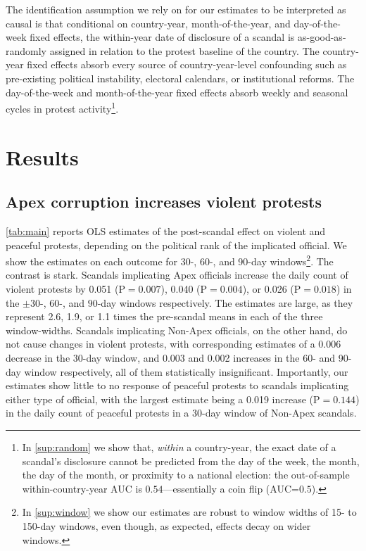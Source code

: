 \documentclass[11pt]{article}
\begin{document}
The identification assumption we rely on for our estimates to be interpreted as causal is that conditional on country-year, month-of-the-year, and day-of-the-week fixed effects, the within-year date of disclosure of a scandal is as-good-as-randomly assigned in relation to the protest baseline of the country. The country-year fixed effects absorb every source of country-year-level confounding such as pre-existing political instability, electoral calendars, or institutional reforms. The day-of-the-week and month-of-the-year fixed effects absorb weekly and seasonal cycles in protest activity\footnote{In \autoref{sup:random} we show that, \emph{within} a country-year, the exact date of a scandal's disclosure cannot be predicted from the day of the week, the month, the day of the month, or proximity to a national election: the out-of-sample within-country-year AUC is $0.54$---essentially a coin flip (AUC=$0.5$).}.

\section{Results}

\subsection{Apex corruption increases violent protests}

\autoref{tab:main} reports OLS estimates of the post-scandal effect on violent and peaceful protests, depending on the political rank of the implicated official. We show the estimates on each outcome for 30-, 60-, and 90-day windows\footnote{In \autoref{sup:window} we show our estimates are robust to window widths of 15- to 150-day windows, even though, as expected, effects decay on wider windows.}. The contrast is stark. Scandals implicating Apex officials increase the daily count of violent protests by 0.051 (P$=0.007$), 0.040 (P$=0.004$), or 0.026 (P$=0.018$) in the $\pm30$-, $60$-, and $90$-day windows respectively. The estimates are large, as they represent 2.6, 1.9, or 1.1 times the pre-scandal means in each of the three window-widths. Scandals implicating Non-Apex officials, on the other hand, do not cause changes in violent protests, with corresponding estimates of a 0.006 decrease in the 30-day window, and 0.003 and 0.002 increases in the 60- and 90-day window respectively, all of them statistically insignificant. Importantly, our estimates show little to no response of peaceful protests to scandals implicating either type of official, with the largest estimate being a 0.019 increase (P$=0.144$) in the daily count of peaceful protests in a 30-day window of Non-Apex scandals. 
\end{document}
